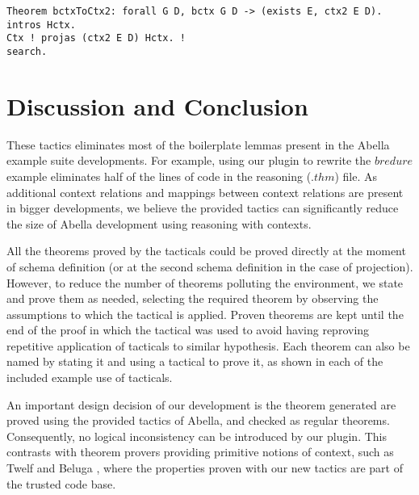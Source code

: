 \documentclass[nocopyrightspace,authoryear]{sigplanconf}
\begin{document}
\begin{itemize}
\begin{lstlisting}
Theorem bctxToCtx2: forall G D, bctx G D -> (exists E, ctx2 E D).
intros Hctx. 
Ctx ! projas (ctx2 E D) Hctx. ! 
search.
\end{lstlisting}


\end{itemize}

\section{Discussion and Conclusion}
These tactics eliminates most of the boilerplate lemmas present in the Abella example suite developments. For example, using our plugin to rewrite the $bredure$ example eliminates half of the lines of code in the reasoning ($.thm$) file. As additional context relations and mappings between context relations are present in bigger developments, we believe the provided tactics can significantly reduce the size of Abella development using reasoning with contexts.

All the theorems proved by the tacticals could be proved directly at the moment of schema definition (or at the second schema definition in the case of projection). However, to reduce the number of theorems polluting the environment, we state and prove them as needed, selecting the required theorem by observing the assumptions to which the tactical is applied. Proven theorems are kept until the end of the proof in which the tactical was used to avoid having reproving repetitive application of tacticals to similar hypothesis. Each theorem can also be named by stating it and using a tactical to prove it, as shown in each of the included example use of tacticals.

An important design decision of our development is the theorem generated are proved using the provided tactics of Abella, and checked as regular theorems. Consequently, no logical inconsistency can be introduced by our plugin. This contrasts with theorem provers providing primitive notions of context, such as Twelf \cite{twelfsys} and Beluga \cite{belugasys}, where the properties proven with our new tactics are part of the trusted code base.
\end{document}
